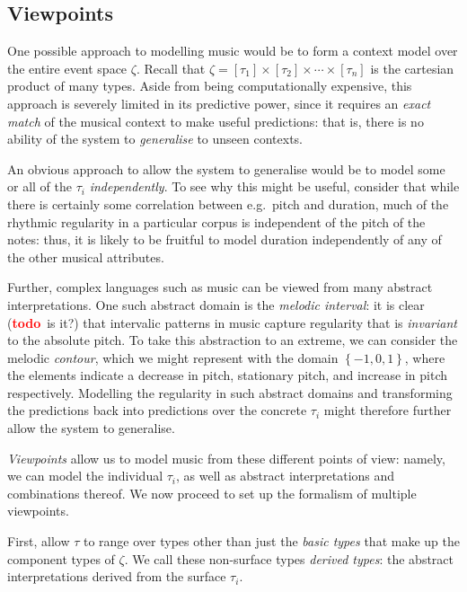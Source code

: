 \documentclass[12pt,a4paper,twoside,openright]{report}
\newcommand{\set}[1]{ \left\{ #1 \right\} }
\newcommand{\todo}{\textcolor{red}{\textbf{todo}~}}
\begin{document}
\subsection{Viewpoints}\label{sec:mvs-formalism}

One possible approach to modelling music would be to form a context model over
the entire event space $\zeta$.  Recall that $\zeta = [\tau_1] \times [\tau_2]
\times \cdots \times [\tau_n]$ is the cartesian product of many types. Aside
from being computationally expensive, this approach is severely limited in its
predictive power, since it requires an \emph{exact match} of the musical
context to make useful predictions: that is, there is no ability of the system
to \emph{generalise} to unseen contexts.

An obvious approach to allow the system to generalise would be to model some or
all of the $\tau_i$ \emph{independently}. To see why this might be useful,
consider that while there is certainly some correlation between e.g.\ pitch and
duration, much of the rhythmic regularity in a particular corpus is independent
of the pitch of the notes: thus, it is likely to be fruitful to model duration
independently of any of the other musical attributes.

Further, complex languages such as music can be viewed from many abstract
interpretations. One such abstract domain is the \emph{melodic
interval}: it is clear (\todo is it?) that intervalic patterns in music capture
regularity that is \emph{invariant} to the absolute pitch. To take this
abstraction to an extreme, we can consider the melodic \emph{contour}, which we
might represent with the domain $\set{-1,0,1}$, where the elements indicate a
decrease in pitch, stationary pitch, and increase in pitch respectively.
Modelling the regularity in such abstract domains and transforming the
predictions back into predictions over the concrete $\tau_i$ might therefore
further allow the system to generalise.  

\emph{Viewpoints} allow us to model music from these different points of view:
namely, we can model the individual $\tau_i$, as well as abstract
interpretations and combinations thereof. We now proceed to set up the formalism
of multiple viewpoints.

First, allow $\tau$ to range over types other than just the \emph{basic types}
that make up the component types of $\zeta$. We call these non-surface types
\emph{derived types}: the abstract interpretations derived from the surface
$\tau_i$. 
\end{document}
